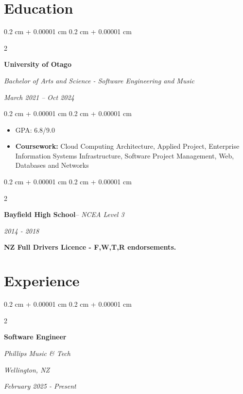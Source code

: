 \documentclass[10pt, letterpaper]{article}
\newenvironment{highlights}{
    \begin{itemize}[
        topsep=0.10 cm,
        parsep=0.10 cm,
        partopsep=0pt,
        itemsep=0pt,
        leftmargin=0.4 cm + 10pt
    ]
}{
    \end{itemize}
} %
\newenvironment{onecolentry}{
    \begin{adjustwidth}{
        0.2 cm + 0.00001 cm
    }{
        0.2 cm + 0.00001 cm
    }
}{
    \end{adjustwidth}
} %
\newenvironment{twocolentry}[2][]{
    \onecolentry
    \def\secondColumn{#2}
    \setcolumnwidth{\fill, 4.5 cm}
    \begin{paracol}{2}
}{
    \switchcolumn \raggedleft \secondColumn
    \end{paracol}
    \endonecolentry
} %
\begin{document}
     \section{Education}

        \begin{twocolentry}{
            
            
        \textit{March 2021 – Oct 2024}}
            \textbf{University of Otago}

            \textit{Bachelor of Arts and Science - Software Engineering and Music }
        \end{twocolentry}

        \vspace{0.10 cm}
        \begin{onecolentry}
            \begin{highlights}
                \item GPA: 6.8/9.0
                \item \textbf{Coursework:} Cloud Computing Architecture, Applied Project, Enterprise Information Systems Infrastructure, Software Project Management, Web, Databases and Networks
            \end{highlights}
        \end{onecolentry}
         \vspace{0.10 cm}

        \begin{twocolentry}{

        \textit{2014 - 2018}}
        \textbf{Bayfield High School}--
        {\textit{NCEA Level 3}}

        \end{twocolentry}

        \vspace{0.10 cm}
        \textbf{NZ Full Drivers Licence - F,W,T,R endorsements.
        } 
    

    
    \section{Experience}
    
    

      \begin{twocolentry}{
        \textit{Wellington, NZ}   
            
        \textit{February 2025 - Present}
        \textit{}}
            \textbf{Software Engineer}

            \textit{Phillips Music \& Tech}
        \end{twocolentry}
\end{document}
